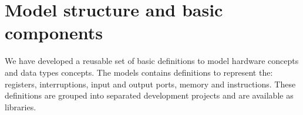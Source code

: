 \documentclass[a4paper]{llncs}
\begin{document}



\section{Model structure and basic components}
\label{sec:models}

We have developed a reusable set of basic definitions to model hardware concepts and data types
concepts. The models contains definitions to represent the: registers, interruptions, input and output
ports, memory and instructions. These definitions are grouped into separated development projects
and are available as libraries.
\end{document}
